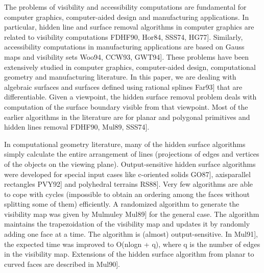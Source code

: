 \documentclass[11pt,letterpaper]{article}
\newcommand{\SectionHeading}[2]{%
  \par\noindent{\fontsize{12}{14}\selectfont\bfseries%
  \if\relax\detokenize{#1}\relax
    #2%
  \else
    #1\hspace{0.35in}#2%
  \fi\par}\vspace{0.1em}%
}
\begin{document}
\endgroup
{}
\clearpage

\SectionHeading{1}{Introduction}
The problems of visibility and accessibility computations are fundamental for computer graphics, computer-aided design and manufacturing applications. In particular, hidden line and surface removal algorithms in computer graphics are related to visibility computations FDHF90, Hor84, SSS74, HG77]. Similarly, accessibility computations in manufacturing applications are based on Gauss maps and visibility sets Woo94, CCW93, GWT94]. These problems have been extensively studied in computer graphics, computer-aided design, computational geometry and manufacturing literature. In this paper, we are dealing with algebraic surfaces and surfaces defined using rational splines Far93] that are differentiable. Given a viewpoint, the hidden surface removal problem deals with computation of the surface boundary visible from that viewpoint. Most of the earlier algorithms in the literature are for planar and polygonal primitives and hidden lines removal FDHF90, Mul89, SSS74].

In computational geometry literature, many of the hidden surface algorithms simply calculate the entire arrangement of lines (projections of edges and vertices of the objects on the viewing plane). Output-sensitive hidden surface algorithms were developed for special input cases like c-oriented solids GO87], axisparallel rectangles PVY92] and polyhedral terrains RS88]. Very few algorithms are able to cope with cycles (impossible to obtain an ordering among the faces without splitting some of them) efficiently. A randomized algorithm to generate the visibility map was given by Mulmuley Mul89] for the general case. The algorithm maintains the trapezoidation of the visibility map and updates it by randomly adding one face at a time. The algorithm is (almost) output-sensitive. In Mul91], the expected time was improved to O(nlogn + q), where q is the number of edges in the visibility map. Extensions of the hidden surface algorithm from planar to curved faces are described in Mul90].
\end{document}
